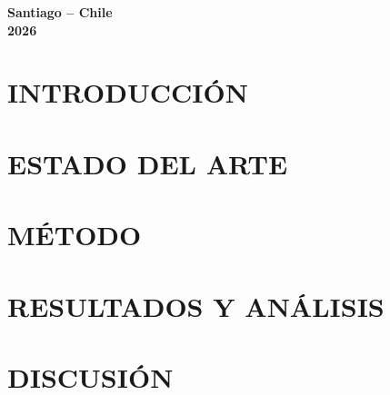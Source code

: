 \documentclass[letterpaper,12pt]{article}
\begin{document}
\begin{titlepage}
    \vfill
    \begin{center}
        {\fontsize{10pt}{12pt}\selectfont
        \textbf{Santiago -- Chile}\\[0.5em]
        \textbf{2026}\par}
    \end{center}
\end{titlepage}

\newpage
{}
\setcounter{page}{1}
\restoregeometry
\setlength{\parindent}{1.5cm}




\clearpage
\tableofcontents
\clearpage
\listoffigures
\clearpage

\setcounter{page}{1}

\newpage
\section{INTRODUCCIÓN}


\newpage
\section{ESTADO DEL ARTE}


\newpage
\section{MÉTODO}



\newpage
\section{RESULTADOS Y ANÁLISIS}
\label{sec:resultados}


\newpage
\section{DISCUSIÓN}

\end{document}
